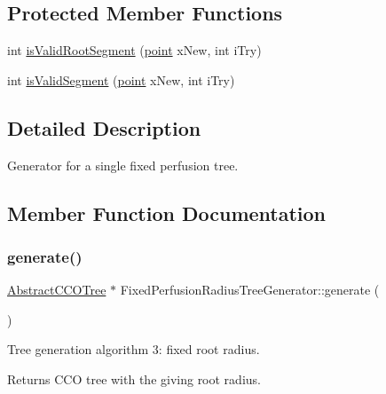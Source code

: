 \subsection*{Protected Member Functions}
\begin{DoxyCompactItemize}
\item 
int \mbox{\hyperlink{class_fixed_perfusion_radius_tree_generator_ae7a7f4b87282f81b141377032a537e08}{is\+Valid\+Root\+Segment}} (\mbox{\hyperlink{structpoint}{point}} x\+New, int i\+Try)
\item 
int \mbox{\hyperlink{class_fixed_perfusion_radius_tree_generator_a306a08e5b09ced0a19fcfae49c7e7399}{is\+Valid\+Segment}} (\mbox{\hyperlink{structpoint}{point}} x\+New, int i\+Try)
\end{DoxyCompactItemize}


\subsection{Detailed Description}
Generator for a single fixed perfusion tree. 

\subsection{Member Function Documentation}
\mbox{\label{class_fixed_perfusion_radius_tree_generator_a628386a3210abbfe8a67417a33d31387}} 
\subsubsection{\texorpdfstring{generate()}{generate()}}
{\footnotesize\ttfamily \mbox{\hyperlink{class_abstract_c_c_o_tree}{Abstract\+C\+C\+O\+Tree}} $\ast$ Fixed\+Perfusion\+Radius\+Tree\+Generator\+::generate (\begin{DoxyParamCaption}{ }\end{DoxyParamCaption})}

Tree generation algorithm 3\+: fixed root radius. \begin{DoxyReturn}{Returns}
C\+CO tree with the giving root radius. 
\end{DoxyReturn}
\mbox{\label{class_fixed_perfusion_radius_tree_generator_ae7a7f4b87282f81b141377032a537e08}} 
